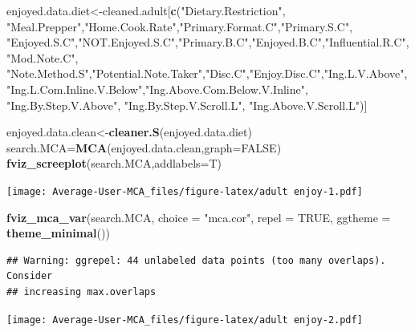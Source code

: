 \documentclass[
]{article}
\newenvironment{Shaded}{\begin{snugshade}}{\end{snugshade}}
\newcommand{\DataTypeTok}[1]{\textcolor[rgb]{0.13,0.29,0.53}{#1}}
\newcommand{\KeywordTok}[1]{\textcolor[rgb]{0.13,0.29,0.53}{\textbf{#1}}}
\newcommand{\NormalTok}[1]{#1}
\newcommand{\OtherTok}[1]{\textcolor[rgb]{0.56,0.35,0.01}{#1}}
\newcommand{\StringTok}[1]{\textcolor[rgb]{0.31,0.60,0.02}{#1}}
\begin{document}
\begin{Shaded}
\begin{Highlighting}[]
\NormalTok{enjoyed.data.diet<-cleaned.adult[}\KeywordTok{c}\NormalTok{(}\StringTok{"Dietary.Restriction"}\NormalTok{, }\StringTok{"Meal.Prepper"}\NormalTok{,}\StringTok{"Home.Cook.Rate"}\NormalTok{,}\StringTok{"Primary.Format.C"}\NormalTok{,}\StringTok{"Primary.S.C"}\NormalTok{,}
            \StringTok{"Enjoyed.S.C"}\NormalTok{,}\StringTok{"NOT.Enjoyed.S.C"}\NormalTok{,}\StringTok{"Primary.B.C"}\NormalTok{,}\StringTok{"Enjoyed.B.C"}\NormalTok{,}\StringTok{"Influential.R.C"}\NormalTok{, }
            \StringTok{"Mod.Note.C"}\NormalTok{, }
            \StringTok{"Note.Method.S"}\NormalTok{,}\StringTok{"Potential.Note.Taker"}\NormalTok{,}\StringTok{"Disc.C"}\NormalTok{,}\StringTok{"Enjoy.Disc.C"}\NormalTok{,}\StringTok{"Ing.L.V.Above"}\NormalTok{,}
            \StringTok{"Ing.L.Com.Inline.V.Below"}\NormalTok{,}\StringTok{"Ing.Above.Com.Below.V.Inline"}\NormalTok{,  }\StringTok{"Ing.By.Step.V.Above"}\NormalTok{,  }\StringTok{"Ing.By.Step.V.Scroll.L"}\NormalTok{,}
            \StringTok{"Ing.Above.V.Scroll.L"}\NormalTok{)]}

\NormalTok{enjoyed.data.clean<-}\KeywordTok{cleaner.S}\NormalTok{(enjoyed.data.diet)}
\NormalTok{search.MCA=}\KeywordTok{MCA}\NormalTok{(enjoyed.data.clean,}\DataTypeTok{graph=}\OtherTok{FALSE}\NormalTok{)}
\KeywordTok{fviz_screeplot}\NormalTok{(search.MCA,}\DataTypeTok{addlabels=}\NormalTok{T)}
\end{Highlighting}
\end{Shaded}

\texttt{[image: Average-User-MCA\_files/figure-latex/adult enjoy-1.pdf]}

\begin{Shaded}
\begin{Highlighting}[]
\KeywordTok{fviz_mca_var}\NormalTok{(search.MCA, }\DataTypeTok{choice =} \StringTok{"mca.cor"}\NormalTok{, }\DataTypeTok{repel =} \OtherTok{TRUE}\NormalTok{,}
             \DataTypeTok{ggtheme =} \KeywordTok{theme_minimal}\NormalTok{())}
\end{Highlighting}
\end{Shaded}

\begin{verbatim}
## Warning: ggrepel: 44 unlabeled data points (too many overlaps). Consider
## increasing max.overlaps
\end{verbatim}

\texttt{[image: Average-User-MCA\_files/figure-latex/adult enjoy-2.pdf]}
\end{document}
